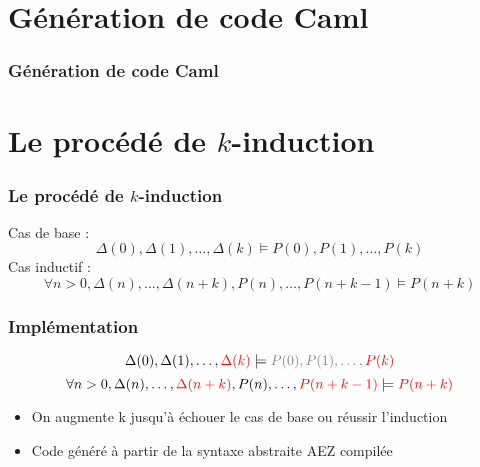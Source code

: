 \documentclass[18pt]{beamer}
\begin{document}
\section{Génération de code Caml}
\begin{frame}
\frametitle{Génération de code Caml}

\end{frame}	

\section{Le procédé de $k$-induction}
\begin{frame}
	\frametitle{Le procédé de $k$-induction}
	Cas de base :	$$\Delta(0), \Delta(1), \ldots, \Delta(k) \models  P(0), P(1), \ldots,  P(k)$$
	Cas inductif : $$\forall n>0, {\Delta(n), \ldots, \Delta(n+k), P(n), \ldots, P(n+k-1) \models P(n+k)}$$

\end{frame}	
\begin{frame}
	\frametitle{Implémentation}

		
			$$\Delta(0), \Delta(1), \ldots, \color{red} \Delta(k) \color{black} \models \color{gray} P(0), P(1), \ldots, \color{red} P(k)\color{black}$$
			$$\forall n>0, {\Delta(n), \ldots, \color{red} \Delta(n+k) \color{black}, P(n), \ldots, \color{red}P(n+k-1) \color{black} \models  \color{red}P(n+k)}\color{black}$$
	\begin{itemize}
		\item{On augmente k jusqu'à échouer le cas de base ou réussir l'induction}
		\item{Code généré à partir de la syntaxe abstraite AEZ compilée}
	\end{itemize}	
\end{frame}


\def\optimisation{Une optimisation : élimination de cas particuliers}
\end{document}
